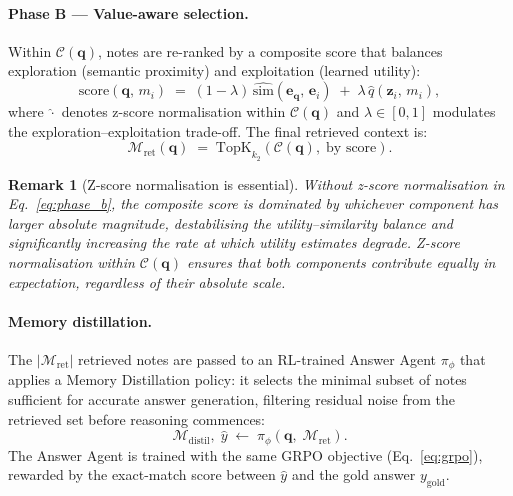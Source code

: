\documentclass{article}
\newtheorem{remark}{Remark}[section]
\newcommand{\memset}{\mathcal{M}}
\newcommand{\note}{m}
\begin{document}
\paragraph{Phase B --- Value-aware selection.}
Within $\mathcal{C}(\mathbf{q})$, notes are re-ranked by a composite score
that balances exploration (semantic proximity) and exploitation (learned
utility):
\begin{equation}
  \mathrm{score}(\mathbf{q},\, \note_i)
  \;=\;
  (1-\lambda)\,\widehat{\mathrm{sim}}(\mathbf{e}_\mathbf{q},\, \mathbf{e}_i)
  \;+\;
  \lambda\,\hat{q}(\mathbf{z}_i,\, \note_i),
  \label{eq:phase_b}
\end{equation}
where $\widehat{\cdot}$ denotes z-score normalisation within
$\mathcal{C}(\mathbf{q})$ and $\lambda \in [0,1]$ modulates the
exploration--exploitation trade-off.
The final retrieved context is:
\begin{equation}
  \memset_{\mathrm{ret}}(\mathbf{q})
  \;=\;
  \mathrm{TopK}_{k_2}\!\left(
    \mathcal{C}(\mathbf{q}),\; \text{by score}
  \right).
  \label{eq:retrieved_set}
\end{equation}

\begin{remark}[Z-score normalisation is essential]
Without z-score normalisation in Eq.~\eqref{eq:phase_b}, the composite score
is dominated by whichever component has larger absolute magnitude,
destabilising the utility--similarity balance and significantly increasing the
rate at which utility estimates degrade.
Z-score normalisation within $\mathcal{C}(\mathbf{q})$ ensures that both
components contribute equally in expectation, regardless of their absolute
scale.
\end{remark}

\paragraph{Memory distillation.}
The $|\memset_{\mathrm{ret}}|$ retrieved notes are passed to an RL-trained
Answer Agent $\pi_\phi$ that applies a Memory Distillation policy: it selects
the minimal subset of notes sufficient for accurate answer generation,
filtering residual noise from the retrieved set before reasoning commences:
\begin{equation}
  \memset_{\mathrm{distil}},\; \hat{y}
  \;\leftarrow\;
  \pi_\phi\!\left(\mathbf{q},\; \memset_{\mathrm{ret}}\right).
  \label{eq:distillation}
\end{equation}
The Answer Agent is trained with the same GRPO objective
(Eq.~\eqref{eq:grpo}), rewarded by the exact-match score between $\hat{y}$
and the gold answer $y_{\mathrm{gold}}$.
\end{document}
